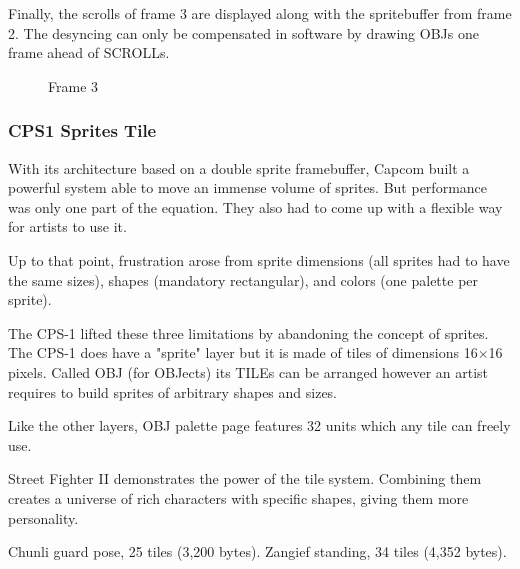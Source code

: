 Finally, the scrolls of frame 3 are displayed along with the spritebuffer from frame 2. The desyncing can only be compensated in software by drawing OBJs one frame ahead of SCROLLs.

\begin{figure}[H]
 \caption*{Frame 3}%
 \end{figure}%





\subsubsection{CPS1 Sprites Tile}
With its architecture based on a double sprite framebuffer, Capcom built a powerful system able to move an immense volume of sprites. But performance was only one part of the equation. They also had to come up with a flexible way for artists to use it.

Up to that point, frustration arose from sprite dimensions (all sprites had to have the same sizes), shapes (mandatory rectangular), and colors (one palette per sprite). 

The CPS-1 lifted these three limitations by abandoning the concept of sprites. The CPS-1 does have a "sprite" layer but it is made of tiles of dimensions 16$\times$16 pixels. Called OBJ (for OBJects) its TILEs can be arranged however an artist requires to build sprites of arbitrary shapes and sizes.

Like the other layers, OBJ palette page features 32 units which any tile can freely use.

\pagebreak

Street Fighter II demonstrates the power of the tile system. Combining them creates a universe of rich characters with specific shapes, giving them more personality.

\begin{minipage}[t]{0.453\linewidth}
\end{minipage}%
\hfill%
\begin{minipage}[t]{0.53\linewidth}
\end{minipage}


Chunli guard pose, 25 tiles (3,200 bytes). Zangief standing, 34 tiles (4,352 bytes). 

\begin{minipage}[t]{0.3\linewidth}
\end{minipage}%
\hfill%
\begin{minipage}[t]{0.53\linewidth}
\end{minipage}


